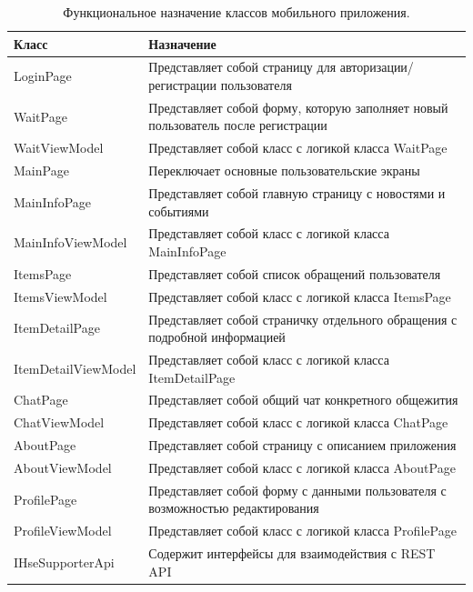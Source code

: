 \documentclass{../includes/TechDoc}
\begin{document}
    \begin{table}[ht]
        \caption{\label{tab:classes-table-mobile}Функциональное назначение классов мобильного приложения.}
        \centering
        \begin{tabular}{ | p{4.5cm} | p{12.5cm} | }
            \hline
            \textbf{Класс} & \textbf{Назначение}  \\ \hline
            LoginPage & Представляет собой страницу для авторизации/регистрации пользователя \\ \hline
            WaitPage & Представляет собой форму, которую заполняет новый пользователь после регистрации \\ \hline
            WaitViewModel & Представляет собой класс с логикой класса WaitPage \\ \hline
            MainPage & Переключает основные пользовательские экраны \\ \hline
            MainInfoPage & Представляет собой главную страницу с новостями и событиями \\ \hline
            MainInfoViewModel & Представляет собой класс с логикой класса MainInfoPage \\ \hline
            ItemsPage & Представляет собой список обращений пользователя \\ \hline
            ItemsViewModel & Представляет собой класс с логикой класса ItemsPage \\ \hline
            ItemDetailPage & Представляет собой страничку отдельного обращения с подробной информацией \\ \hline
            ItemDetailViewModel & Представляет собой класс с логикой класса ItemDetailPage \\ \hline
            ChatPage & Представляет собой общий чат конкретного общежития \\ \hline
            ChatViewModel & Представляет собой класс с логикой класса ChatPage \\ \hline
            AboutPage & Представляет собой страницу с описанием приложения \\ \hline
            AboutViewModel & Представляет собой класс с логикой класса AboutPage \\ \hline
            ProfilePage & Представляет собой форму с данными пользователя с возможностью редактирования \\ \hline
            ProfileViewModel & Представляет собой класс с логикой класса ProfilePage \\ \hline
            IHseSupporterApi & Содержит интерфейсы для взаимодействия с REST API \\ \hline

\end{tabular}
\end{table}
\end{document}
